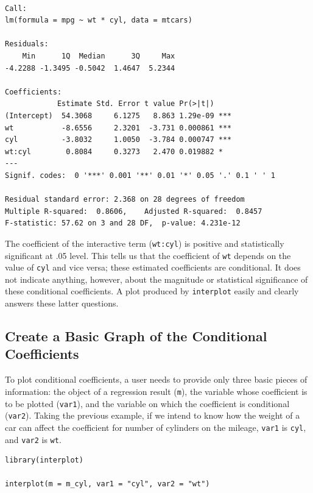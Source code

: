 \documentclass[
  article]{jss}
\begin{document}
\begin{verbatim}

Call:
lm(formula = mpg ~ wt * cyl, data = mtcars)

Residuals:
    Min      1Q  Median      3Q     Max 
-4.2288 -1.3495 -0.5042  1.4647  5.2344 

Coefficients:
            Estimate Std. Error t value Pr(>|t|)    
(Intercept)  54.3068     6.1275   8.863 1.29e-09 ***
wt           -8.6556     2.3201  -3.731 0.000861 ***
cyl          -3.8032     1.0050  -3.784 0.000747 ***
wt:cyl        0.8084     0.3273   2.470 0.019882 *  
---
Signif. codes:  0 '***' 0.001 '**' 0.01 '*' 0.05 '.' 0.1 ' ' 1

Residual standard error: 2.368 on 28 degrees of freedom
Multiple R-squared:  0.8606,    Adjusted R-squared:  0.8457 
F-statistic: 57.62 on 3 and 28 DF,  p-value: 4.231e-12
\end{verbatim}

The coefficient of the interactive term (\texttt{wt:cyl}) is positive
and statistically significant at .05 level. This tells us that the
coefficient of \texttt{wt} depends on the value of \texttt{cyl} and vice
versa; these estimated coefficients are conditional. It does not
indicate anything, however, about the magnitude or statistical
significance of these conditional coefficients. A plot produced by
\texttt{interplot} easily and clearly answers these latter questions.

\hypertarget{sec-create-a-basic-graph-of-the-conditional-coefficients}{%
\subsection{Create a Basic Graph of the Conditional
Coefficients}\label{sec-create-a-basic-graph-of-the-conditional-coefficients}}

To plot conditional coefficients, a user needs to provide only three
basic pieces of information: the object of a regression result
(\texttt{m}), the variable whose coefficient is to be plotted
(\texttt{var1}), and the variable on which the coefficient is
conditional (\texttt{var2}). Taking the previous example, if we intend
to know how the weight of a car can affect the coefficient for number of
cylinders on the mileage, \texttt{var1} is \texttt{cyl}, and
\texttt{var2} is \texttt{wt}.

\begin{verbatim}
library(interplot)

interplot(m = m_cyl, var1 = "cyl", var2 = "wt")
\end{verbatim}
\end{document}
